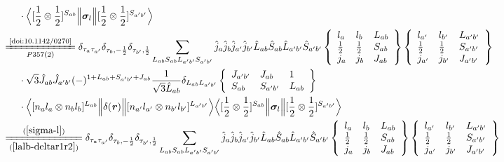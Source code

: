 \documentclass[master]{shnuthesis}
\newcommand{\bmr}{\textbf{\textit{r}}}
\newcommand{\ap}{a^\prime}
\newcommand{\bp}{b^\prime}
\newcommand{\il}{\!\!\!\!\!\!\!\!\!\!}
\newcommand{\zdydh}{\xlongequal}
\begin{document}
\begin{align}
    & \cdot \Big\langle [\frac{1}{2}\otimes\frac{1}{2}]^{S_{ab}} \Big\| \bm{\sigma}_l \Big\| [\frac{1}{2}\otimes\frac{1}{2}]^{S_{\ap\bp}} \Big\rangle \\
    &\il \zdydh[P357(2)]{\text{\cite{doi:10.1142/0270}}} \delta_{\tau_a \tau_{\ap}}\delta_{\tau_b, -\frac{1}{2}}\delta_{\tau_{\bp}, \frac{1}{2}} \sum_{L_{ab}S_{ab}L_{\ap\bp}S_{\ap\bp}} \hat{j}_a\hat{j}_b\hat{j}_{\ap}\hat{j}_{\bp}\hat{L}_{ab}\hat{S}_{ab}\hat{L}_{\ap\bp}\hat{S}_{\ap\bp}  \left\{\begin{array}{lll}l_{a} & l_{b} & L_{ab} \\ \frac{1}{2} & \frac{1}{2} & S_{ab} \\j_{a} & j_{b} & J_{ab} \end{array}\right\}  \left\{\begin{array}{lll}l_{\ap} & l_{\bp} & L_{\ap\bp} \\ \frac{1}{2} & \frac{1}{2} & S_{\ap\bp} \\j_{\ap} & j_{\bp} & J_{\ap\bp} \end{array}\right\}  \notag \\
    & \cdot \sqrt{3}\hat{J}_{ab}\hat{J}_{\ap\bp}(-)^{1+L_{ab}+S_{\ap\bp}+J_{ab}}\frac{1}{\sqrt{3}\hat{L}_{ab}}\delta_{L_{ab}L_{\ap\bp}}  \left\{\begin{array}{lll} J_{\ap\bp} & J_{ab} & 1 \\ S_{ab} & S_{\ap\bp} & L_{ab} \end{array}\right\}  \notag\\
    & \cdot \Big\langle [n_a l_a \otimes n_b l_b]^{L_{ab}} \Big\| \delta(\bmr) \Big\| [n_{\ap} l_{\ap} \otimes n_{\bp} l_{\bp}]^{L_{\ap\bp}} \Big\rangle \Big\langle [\frac{1}{2}\otimes\frac{1}{2}]^{S_{ab}} \Big\| \bm{\sigma}_l \Big\| [\frac{1}{2}\otimes\frac{1}{2}]^{S_{\ap\bp}} \Big\rangle  \\
    &\il \zdydh[(\ref{lalb-deltar1r2})]{(\ref{sigma-l})} \delta_{\tau_a \tau_{\ap}}\delta_{\tau_b, -\frac{1}{2}}\delta_{\tau_{\bp}, \frac{1}{2}} \sum_{L_{ab}S_{ab}L_{\ap\bp}S_{\ap\bp}} \hat{j}_a\hat{j}_b\hat{j}_{\ap}\hat{j}_{\bp}\hat{L}_{ab}\hat{S}_{ab}\hat{L}_{\ap\bp}\hat{S}_{\ap\bp}  \left\{\begin{array}{lll}l_{a} & l_{b} & L_{ab} \\ \frac{1}{2} & \frac{1}{2} & S_{ab} \\j_{a} & j_{b} & J_{ab} \end{array}\right\}  \left\{\begin{array}{lll}l_{\ap} & l_{\bp} & L_{\ap\bp} \\ \frac{1}{2} & \frac{1}{2} & S_{\ap\bp} \\j_{\ap} & j_{\bp} & J_{\ap\bp} \end{array}\right\}  \notag \\

\end{align}
\end{document}
